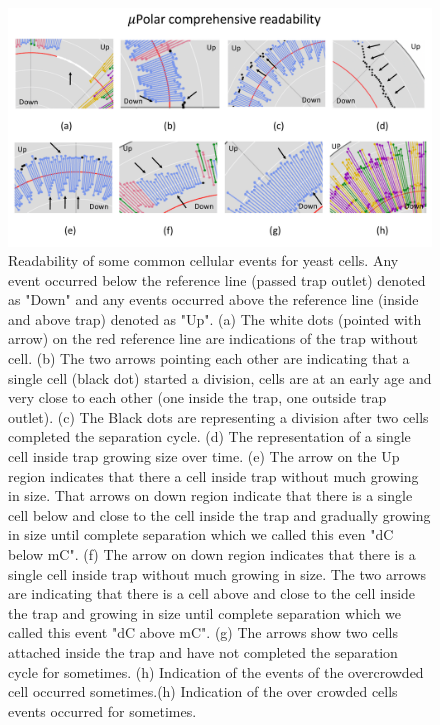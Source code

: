 \documentclass[conference]{IEEEtran}
\begin{document}
\begin{figure}
\centering
\includegraphics[width=\textwidth,height=10 cm]{Patterns/read.pdf}
\caption{Readability of some common cellular events for yeast cells. Any event occurred below the reference line (passed trap outlet) denoted as "Down" and any events occurred above the reference line (inside and above trap) denoted as "Up". (a) The white dots (pointed with arrow) on the red reference line are indications of the trap without cell. (b) The two arrows pointing each other are indicating that a single cell (black dot) started a division, cells are at an early age and very close to each other (one inside the trap, one outside trap outlet). (c) The Black dots are representing a division after two cells completed the separation cycle. (d) The representation of a single cell inside trap growing size over time. (e) The arrow on the Up region indicates that there a cell inside trap without much growing in size. That arrows on down region indicate that there is a single cell below and close to the cell inside the trap and gradually growing in size until complete separation which we called this even "dC below mC". (f) The arrow on down region indicates that there is a single cell inside trap without much growing in size. The two arrows are indicating that there is a cell above and close to the cell inside the trap and growing in size until complete separation which we called this event "dC above mC". (g) The arrows show two cells attached inside the trap and have not completed the separation cycle for sometimes. (h) Indication of the events of the overcrowded cell occurred sometimes.(h) Indication of the over crowded cells events occurred for sometimes.}

\label{fig:read}
\end{figure}
\end{document}
